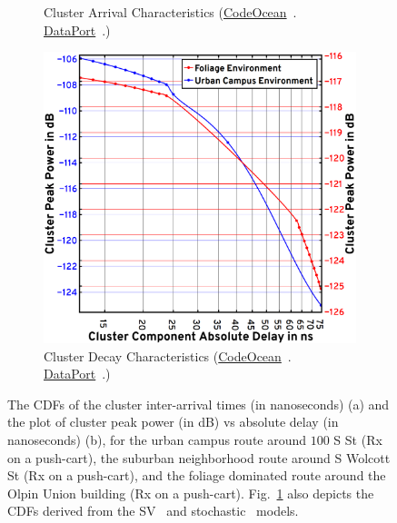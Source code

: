 \documentclass[10pt, twocolumn]{IEEEtran}
\begin{document}
{\begin{figure} [t]
\begin{subfigure}{0.4975\linewidth}
        \caption{Cluster Arrival Characteristics (\href{https://codeocean.com/capsule/9545863/tree}{CodeOcean}~\cite{CodeOcean}. \href{http://ieee-dataport.org/12580}{DataPort}~\cite{DataPort}.)}
        \label{F12a}
    \end{subfigure}
    \begin{subfigure}{0.4925\linewidth}
        \centering
        \includegraphics[width=1.0\linewidth]{figs/cluster_decay_characteristics.png}
        \caption{Cluster Decay Characteristics (\href{https://codeocean.com/capsule/9545863/tree}{CodeOcean}~\cite{CodeOcean}. \href{http://ieee-dataport.org/12580}{DataPort}~\cite{DataPort}.)}
        \label{F12b}
    \end{subfigure}
    \vspace{-5mm}
    \caption{The CDFs of the cluster inter-arrival times (in nanoseconds) (a) and the plot of cluster peak power (in dB) vs absolute delay (in nanoseconds) (b), for the urban campus route around $100$ S St (Rx on a push-cart), the suburban neighborhood route around S Wolcott St (Rx on a push-cart), and the foliage dominated route around the Olpin Union building (Rx on a push-cart). Fig.~\ref{F12a} also depicts the CDFs derived from the SV~\cite{SV_Molisch} and stochastic~\cite{Indoor60G} models.}
    \vspace{-6mm}
    \label{F12}
\end{figure}
}
\end{document}
